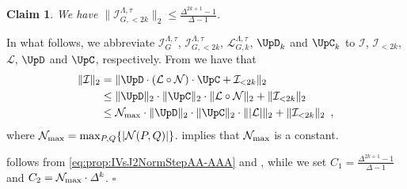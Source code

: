 \documentclass[11pt,reqno]{amsart}
\numberwithin{equation}{section}
\newtheorem{claim}[theorem]{Claim}
\newcommand{\cI}{{\mathcal{I}}}
\newcommand{\cL}{{\mathcal{L}}}
\newcommand{\cN}{{\mathcal{N}}}
\newcommand{\applegreen}[1]{ {\color{applegreen}#1}}
\newcommand{\amethyst}[1]{{\color{amethyst}#1} }
\newcommand{\blue}[1]{{\color{blue}#1}}
\newcommand{\bluepigment}[1]{{\color{blue(pigment)}#1}}
\newcommand{\goldenbrown}[1]{{\color{goldenbrown}#1}}
\newcommand{\rosegold}[1]{{\color{rosegold}#1}}
\newcommand{\maxDeg}{{\Delta}}
\newcommand{\infmatrix}{\cI}
\newcommand{\norm}[2]{\goldenbrown{\|} #1 \goldenbrown{\|}_{#2}}
\newcommand{\abs}[1]{\blue{|}#1\blue{|}}
\newcommand{\VToEdge}{\UpD}
\newcommand{\EdgeToV}{\UpC}
\renewcommand{\applegreen}[1]{#1}
\renewcommand{\amethyst}[1]{#1}
\renewcommand{\blue}[1]{#1}
\renewcommand{\bluepigment}[1]{#1}
\renewcommand{\goldenbrown}[1]{#1}
\renewcommand{\rosegold}[1]{#1}
\newcommand{\kk}{\bluepigment{k}}
\newcommand{\kP}{\goldenbrown{P}}
\newcommand{\kQ}{\amethyst{Q}}
\renewcommand{\kk}{k}
\renewcommand{\kP}{P}
\renewcommand{\kQ}{Q}
\newcommand{\ExtdInfMatrix}{\rosegold{\cL}}
\newcommand{\ExtdInfMatrixF}{\applegreen{\cL}^{\Lambda,\tau}_{G,\kk}}
\newcommand{\SymWeightM}{\cN}
\begin{document}
\begin{claim}\label{claim:2Norm4BoundedNoOfIL-AAA}
We have $\norm{\infmatrix^{\Lambda,\tau}_{G, <2\kk}}{2} \leq \frac{\maxDeg^{2\kk+1}-1}{\maxDeg-1}$.
\end{claim}


\noindent
In what follows, we abbreviate $\infmatrix^{\Lambda,\tau}_{G}$, $\infmatrix^{\Lambda,\tau}_{G, <2\kk}$, $\ExtdInfMatrixF$,
 $\VToEdge_{\kk}$ and $\EdgeToV_{\kk}$ to 
$\infmatrix$, $\infmatrix_{<2\kk}$, $\ExtdInfMatrix$, $\VToEdge$ and $\EdgeToV$, respectively.
%
From  we have that 
\begin{align}
\norm{\infmatrix }{2} & = \norm{\VToEdge \cdot \left( \ExtdInfMatrix\circ \SymWeightM \right )\cdot \EdgeToV+ \infmatrix_{<2\kk} }{2} \nonumber \\
&\leq \norm{ \VToEdge}{2} \cdot \norm{ \EdgeToV}{2} \cdot \norm{\ExtdInfMatrix\circ \SymWeightM }{2}
+ \norm{ \infmatrix_{<2\kk}}{2} \nonumber \\
&\leq \SymWeightM_{\rm max}\cdot \norm{ \VToEdge }{2} \cdot \norm{ \EdgeToV}{2} \cdot \norm{ \abs{ \ExtdInfMatrix } }{2}
+ \norm{ \infmatrix_{<2\kk}}{2} \label{eq:prop:IVsJ2NormStepAA-AAA} \enspace, 
\end{align}
where $\SymWeightM_{\rm max}=\max_{\kP,\kQ}\{\abs{\SymWeightM(\kP,\kQ )}\}$.  implies that $\SymWeightM_{\rm max}$
is a constant. 



 follows from \eqref{eq:prop:IVsJ2NormStepAA-AAA} and
%
, while we set 
$C_1=\frac{\maxDeg^{2\kk+1}-1}{\maxDeg-1}$
and $C_2=\SymWeightM_{\rm max}\cdot \maxDeg^{\kk}$.
%
\hfill $\square$
\end{document}
